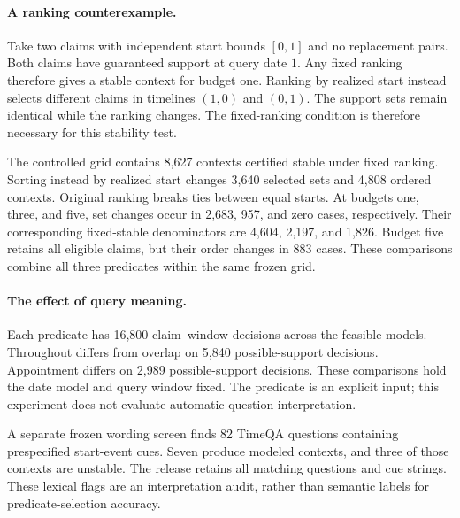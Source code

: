 \paragraph{A ranking counterexample.}
Take two claims with independent start bounds $[0,1]$ and no replacement pairs.
Both claims have guaranteed support at query date $1$.
Any fixed ranking therefore gives a stable context for budget one.
Ranking by realized start instead selects different claims in timelines $(1,0)$ and $(0,1)$.
The support sets remain identical while the ranking changes.
The fixed-ranking condition is therefore necessary for this stability test.

The controlled grid contains 8,627 contexts certified stable under fixed ranking.
Sorting instead by realized start changes 3,640 selected sets and 4,808 ordered contexts.
Original ranking breaks ties between equal starts.
At budgets one, three, and five, set changes occur in 2,683, 957, and zero cases, respectively.
Their corresponding fixed-stable denominators are 4,604, 2,197, and 1,826.
Budget five retains all eligible claims, but their order changes in 883 cases.
These comparisons combine all three predicates within the same frozen grid.

\paragraph{The effect of query meaning.}
Each predicate has 16,800 claim--window decisions across the feasible models.
Throughout differs from overlap on 5,840 possible-support decisions.
Appointment differs on 2,989 possible-support decisions.
These comparisons hold the date model and query window fixed.
The predicate is an explicit input; this experiment does not evaluate automatic question interpretation.

A separate frozen wording screen finds 82 TimeQA questions containing prespecified start-event cues.
Seven produce modeled contexts, and three of those contexts are unstable.
The release retains all matching questions and cue strings.
These lexical flags are an interpretation audit, rather than semantic labels for predicate-selection accuracy.
